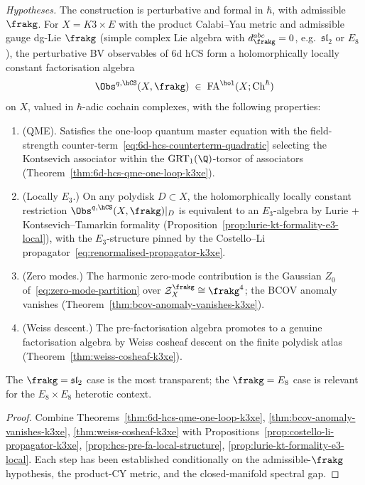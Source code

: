 \begin{theorem}
\label{thm:6d-hcs-factorisation-algebra-k3xe}
\noindent\emph{Hypotheses.} The construction is perturbative and formal in $\hbar$, with admissible $\frakg$.
For $X = K3 \times E$ with the product Calabi--Yau metric and
admissible gauge dg-Lie $\frakg$ \textup{(}simple complex Lie algebra
with $d^{abc}_\frakg = 0$, e.g.\ $\mathfrak{sl}_2$ or $E_8$\textup{)},
the perturbative BV observables of $6$d hCS form a holomorphically
locally constant factorisation algebra
\[
 \Obs^{q,\hCS}(X, \frakg) \;\in\; \operatorname{FA}^{\hol}(X; \operatorname{Ch}^{\hbar})
\]
on $X$, valued in $\hbar$-adic cochain complexes, with the following
properties:
\begin{enumerate}
\item[\textup{(i)}] \textup{(QME).} Satisfies the one-loop quantum master
equation with the field-strength counter-term~\eqref{eq:6d-hcs-counterterm-quadratic}
selecting the Kontsevich associator within the
$\mathrm{GRT}_1(\Q)$-torsor of associators
\textup{(}Theorem~\ref{thm:6d-hcs-qme-one-loop-k3xe}\textup{).}
\item[\textup{(ii)}] \textup{(Locally $E_3$.)} On any polydisk
$D \subset X$, the holomorphically locally constant restriction
$\Obs^{q,\hCS}(X, \frakg)|_D$ is equivalent to an $E_3$-algebra by
Lurie + Kontsevich--Tamarkin formality
\textup{(}Proposition~\ref{prop:lurie-kt-formality-e3-local}\textup{),}
with the $E_3$-structure pinned by the Costello--Li
propagator~\eqref{eq:renormalised-propagator-k3xe}.
\item[\textup{(iii)}] \textup{(Zero modes.)} The harmonic zero-mode
contribution is the Gaussian $Z_0$
of~\eqref{eq:zero-mode-partition} over $\mathcal{Z}_X^\frakg \cong \frakg^4$;
the BCOV anomaly vanishes
\textup{(}Theorem~\ref{thm:bcov-anomaly-vanishes-k3xe}\textup{).}
\item[\textup{(iv)}] \textup{(Weiss descent.)} The pre-factorisation
algebra promotes to a genuine factorisation algebra by Weiss cosheaf
descent on the finite polydisk atlas
\textup{(}Theorem~\ref{thm:weiss-cosheaf-k3xe}\textup{).}
\end{enumerate}
The $\frakg = \mathfrak{sl}_2$ case is the most transparent; the
$\frakg = E_8$ case is relevant for the $E_8 \times E_8$ heterotic
context.
\end{theorem}

\begin{proof}
Combine Theorems~\ref{thm:6d-hcs-qme-one-loop-k3xe},
\ref{thm:bcov-anomaly-vanishes-k3xe}, \ref{thm:weiss-cosheaf-k3xe}
with Propositions~\ref{prop:costello-li-propagator-k3xe},
\ref{prop:hcs-pre-fa-local-structure}, \ref{prop:lurie-kt-formality-e3-local}.
Each step has been established conditionally on the admissible-$\frakg$
hypothesis, the product-CY metric, and the closed-manifold spectral gap.
\end{proof}

